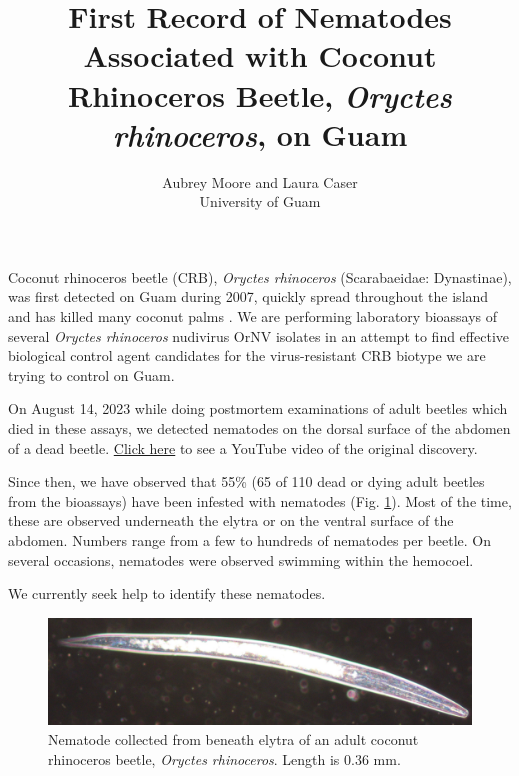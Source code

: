 \documentclass[12pt,letterpaper,english,bibliography=totocnumbered, abstract=on]{scrartcl}
\begin{document}
\titlehead{DRAFT}

\title{First Record of Nematodes Associated with Coconut Rhinoceros Beetle, \textit{Oryctes rhinoceros}, on Guam}

\author{Aubrey Moore and Laura Caser \\ University of Guam}


\maketitle


Coconut rhinoceros beetle (CRB), \textit{Oryctes rhinoceros} (Scarabaeidae: Dynastinae), was first detected on Guam during 2007, quickly spread throughout the island and has killed many coconut palms \parencite{marshall_new_2017-1}.
We are performing laboratory bioassays of several \textit{Oryctes rhinoceros} nudivirus OrNV isolates in an attempt to find effective biological control agent candidates for the virus-resistant CRB biotype we are trying to control on Guam. 

On August 14, 2023 while doing postmortem examinations of adult beetles which died in these assays, we detected nematodes on the dorsal surface of the abdomen of a dead beetle. \href{https://www.youtube.com/shorts/dKVup7q7FF0}{Click here} to see a YouTube video of the original discovery.

Since then, we have observed that 55\% (65 of 110 dead or dying adult beetles from the bioassays) have been infested with nematodes (Fig. \ref{fig:nematode}). Most of the time, these are observed underneath the elytra or on the ventral surface of the abdomen. Numbers range from a few to hundreds of nematodes per beetle. On several occasions, nematodes were observed swimming within the hemocoel.

We currently seek help to identify these nematodes.

\begin{figure}[H]
	\centering
	\includegraphics[width=\linewidth]{images/nematode2}
	\caption{Nematode collected from beneath elytra of an adult coconut rhinoceros beetle, \textit{Oryctes rhinoceros}. Length is 0.36 mm.}
	\label{fig:nematode}
\end{figure}
\end{document}
